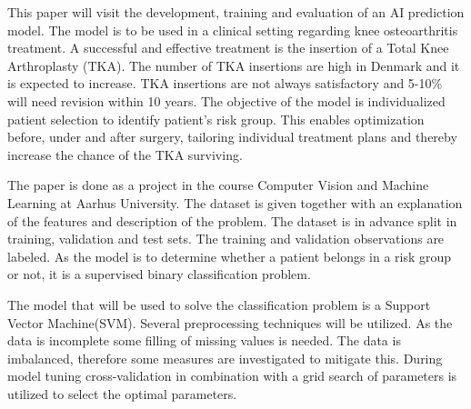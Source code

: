 
This paper will visit the development, training and evaluation of an AI prediction model. The model is to be used in a clinical setting regarding knee osteoarthritis treatment. A successful and effective treatment is the insertion of a Total Knee Arthroplasty (TKA). The number of TKA insertions are high in Denmark and it is expected to increase. TKA insertions are not always satisfactory and 5-10\% will need revision within 10 years. The objective of the model is individualized patient selection to identify patient's risk group. This enables optimization before, under and after surgery, tailoring  individual treatment plans and thereby increase the chance of the TKA surviving\cite{problem-description}.           

The paper is done as a project in the course Computer Vision and Machine Learning at Aarhus University. The dataset is given together with an explanation of the features and description of the problem. The dataset is in advance split in training, validation and test sets. The training and validation observations are labeled. As the model is to determine whether a patient belongs in a risk group or not, it is a supervised binary classification problem.

The model that will be used to solve the classification problem is a Support Vector Machine(SVM). Several preprocessing techniques will be utilized. As the data is incomplete some filling of missing values is needed. The data is imbalanced, therefore some measures are investigated to mitigate this. During model tuning cross-validation in combination with a grid search of parameters is utilized to select the optimal parameters.  
